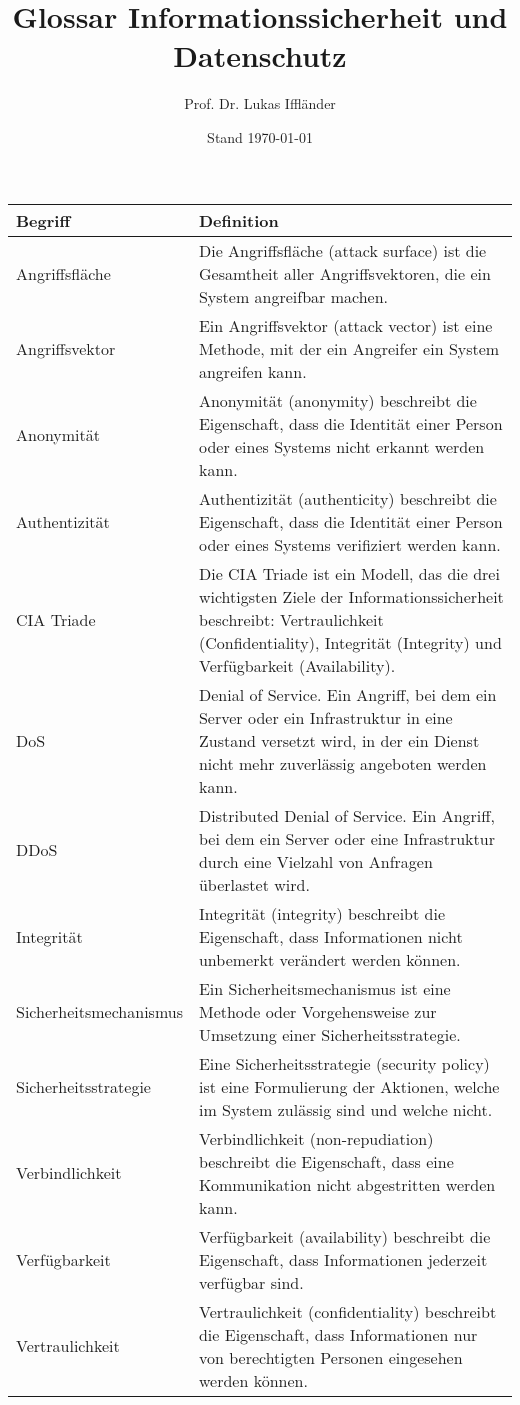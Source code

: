 \documentclass{scrartcl}
\title{Glossar Informationssicherheit und Datenschutz}
\author{Prof. Dr. Lukas Iffländer}
\date{Stand \today}
\begin{document}
\maketitle

\begin{xltabular}{\textwidth}{lX}
    \toprule
    Begriff & Definition \\
    \midrule
    \endhead
    \bottomrule
    \endfoot
    Angriffsfläche & Die Angriffsfläche (attack surface) ist die Gesamtheit aller Angriffsvektoren, die ein System angreifbar machen. \\
    Angriffsvektor & Ein Angriffsvektor (attack vector) ist eine Methode, mit der ein Angreifer ein System angreifen kann. \\
    Anonymität & Anonymität (anonymity) beschreibt die Eigenschaft, dass die Identität einer Person oder eines Systems nicht erkannt werden kann. \\
    Authentizität & Authentizität (authenticity) beschreibt die Eigenschaft, dass die Identität einer Person oder eines Systems verifiziert werden kann. \\
    CIA Triade & Die CIA Triade ist ein Modell, das die drei wichtigsten Ziele der Informationssicherheit beschreibt: Vertraulichkeit (Confidentiality), Integrität (Integrity) und Verfügbarkeit (Availability). \\
    DoS & Denial of Service. Ein Angriff, bei dem ein Server oder ein Infrastruktur in eine Zustand versetzt wird, in der ein Dienst nicht mehr zuverlässig angeboten werden kann. \\
    DDoS & Distributed Denial of Service. Ein Angriff, bei dem ein Server oder eine Infrastruktur durch eine Vielzahl von Anfragen überlastet wird. \\
    Integrität & Integrität (integrity) beschreibt die Eigenschaft, dass Informationen nicht unbemerkt verändert werden können. \\
    Sicherheitsmechanismus & Ein Sicherheitsmechanismus ist eine Methode oder Vorgehensweise zur Umsetzung einer Sicherheitsstrategie. \\
    Sicherheitsstrategie & Eine Sicherheitsstrategie (security policy) ist eine Formulierung der Aktionen, welche im System zulässig sind und welche nicht. \\
    Verbindlichkeit & Verbindlichkeit (non-repudiation) beschreibt die Eigenschaft, dass eine Kommunikation nicht abgestritten werden kann. \\
    Verfügbarkeit & Verfügbarkeit (availability) beschreibt die Eigenschaft, dass Informationen jederzeit verfügbar sind. \\
    Vertraulichkeit & Vertraulichkeit (confidentiality) beschreibt die Eigenschaft, dass Informationen nur von berechtigten Personen eingesehen werden können. \\
\end{xltabular}
\end{document}
